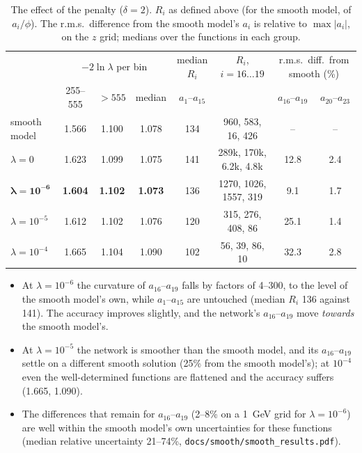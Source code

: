 \documentclass[11pt]{article}
\newcommand{\file}[1]{\nolinkurl{#1}}
\begin{document}
\begin{table}[h]
\centering
\small
\setlength{\tabcolsep}{4pt}
\begin{tabular}{lccccccc}
\toprule
 & \multicolumn{3}{c}{$-2\ln\lambda$ per bin} & median $R_i$ & $R_i$, $i = 16 \dots 19$ & \multicolumn{2}{c}{r.m.s.\ diff.\ from smooth (\%)}\\
 & 255--555 & $>555$ & median & $a_1$--$a_{15}$ & & $a_{16}$--$a_{19}$ & $a_{20}$--$a_{23}$\\
\midrule
smooth model & 1.566 & 1.100 & 1.078 & 134 & 960, 583, 16, 426 & -- & --\\
\midrule
$\lambda = 0$ & 1.623 & 1.099 & 1.075 & 141 & 289k, 170k, 6.2k, 4.8k & 12.8 & 2.4\\
$\boldsymbol{\lambda = 10^{-6}}$ & \textbf{1.604} & \textbf{1.102} & \textbf{1.073} & 136 & 1270, 1026, 1557, 319 & 9.1 & 1.7\\
$\lambda = 10^{-5}$ & 1.612 & 1.102 & 1.076 & 120 & 315, 276, 408, 86 & 25.1 & 1.4\\
$\lambda = 10^{-4}$ & 1.665 & 1.104 & 1.090 & 102 & 56, 39, 86, 10 & 32.3 & 2.8\\
\bottomrule
\end{tabular}
\caption{The effect of the penalty ($\delta = 2$). $R_i$ as defined above (for the smooth model, of
$a_i/\phi$). The r.m.s.\ difference from the smooth model's $a_i$ is relative to $\max|a_i|$, on the $z$
grid; medians over the functions in each group.}
\label{tab:curv}
\end{table}

\begin{itemize}
  \item At $\lambda = 10^{-6}$ the curvature of $a_{16}$--$a_{19}$ falls by factors of 4--300, to the level of
    the smooth model's own, while $a_1$--$a_{15}$ are untouched (median $R_i$ 136 against 141). The accuracy
    improves slightly, and the network's $a_{16}$--$a_{19}$ move \emph{towards} the smooth model's.
  \item At $\lambda = 10^{-5}$ the network is smoother than the smooth model, and its $a_{16}$--$a_{19}$ settle on a
    different smooth solution (25\% from the smooth model's); at $10^{-4}$ even the well-determined functions
    are flattened and the accuracy suffers (1.665, 1.090).
  \item The differences that remain for $a_{16}$--$a_{19}$ (2--8\% on a 1~GeV grid for $\lambda = 10^{-6}$) are well
    within the smooth model's own uncertainties for these functions (median relative uncertainty 21--74\%,
    \file{docs/smooth/smooth_results.pdf}).
\end{itemize}
\end{document}
